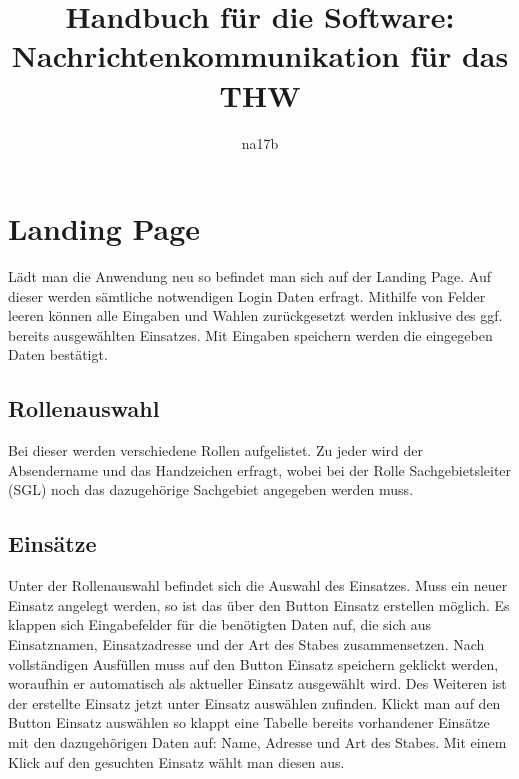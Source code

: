\documentclass[a4paper,11pt,oneside, titlepage]{article}
\title{Handbuch für die Software: Nachrichtenkommunikation für das THW}
\author{na17b}
\date{}
\begin{document}
	\maketitle
	\tableofcontents
	
	\newpage
	
	\section{Landing Page}
	Lädt man die Anwendung neu so befindet man sich auf der Landing Page. Auf dieser werden sämtliche notwendigen Login Daten erfragt.
	\newline
	Mithilfe von \glqq{}Felder leeren\grqq{} können alle Eingaben und Wahlen zurückgesetzt werden inklusive des ggf. bereits ausgewählten Einsatzes.
	Mit \glqq{}Eingaben speichern\grqq{} werden die eingegeben Daten bestätigt.
	
	\subsection{Rollenauswahl}
	Bei dieser werden verschiedene Rollen aufgelistet. Zu jeder wird der Absendername und das Handzeichen erfragt, wobei bei der Rolle Sachgebietsleiter (SGL) noch das dazugehörige Sachgebiet angegeben werden muss.
	
	\subsection{Einsätze}
	Unter der Rollenauswahl befindet sich die Auswahl des Einsatzes.
	Muss ein neuer Einsatz angelegt werden, so ist das über den Button \glqq{}Einsatz erstellen\grqq{} möglich. Es klappen sich Eingabefelder für die benötigten Daten auf, die sich aus Einsatznamen, Einsatzadresse und der Art des Stabes zusammensetzen. Nach vollständigen Ausfüllen muss auf den Button \glqq{} Einsatz speichern \grqq{} geklickt werden, woraufhin er automatisch als aktueller Einsatz ausgewählt wird. Des Weiteren ist der erstellte Einsatz jetzt unter \glqq{} Einsatz auswählen \grqq zufinden.
	\newline
	\newline
	Klickt man auf den Button \glqq{}Einsatz auswählen\grqq{} so klappt eine Tabelle bereits vorhandener Einsätze mit den dazugehörigen Daten auf: Name, Adresse und Art des Stabes. Mit einem Klick auf den gesuchten Einsatz wählt man diesen aus.
	
\end{document}
